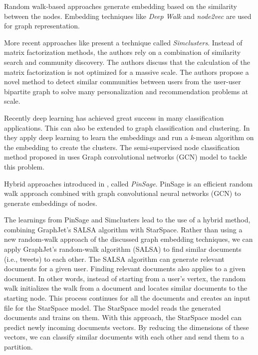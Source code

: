 Random walk-based approaches generate embedding based on the similarity between the nodes. Embedding techniques like \emph{Deep Walk} \cite{perozziDeepWalkOnlineLearning2014} and \emph{node2vec} \cite{groverNode2vecScalableFeature2016} are used for graph representation.


More recent approaches like \cite{satuluriSimClustersCommunityBasedRepresentations2020} present a technique called \emph{Simclusters}. Instead of matrix factorization methods, the authors rely on a combination of similarity search and community discovery. The authors discuss that the calculation of the matrix factorization is not optimized for a massive scale. The authors propose a novel method to detect similar communities between users from the user-user bipartite graph to solve many personalization and recommendation problems at scale.


Recently deep learning has achieved great success in many classification applications. This can also be extended to graph classification and clustering. In \cite{tianLearningDeepRepresentations2014} they apply deep learning to learn the embeddings and run a \emph{k}-mean algorithm on the embedding to create the clusters. The semi-supervised node classification method proposed in \cite{kipfSemiSupervisedClassificationGraph2017} uses Graph convolutional networks (GCN) model to tackle this problem. 

Hybrid approaches introduced in \cite{yingGraphConvolutionalNeural2018}, called \emph{PinSage}. PinSage is an efficient random walk approach combined with graph convolutional neural networks (GCN) to generate embeddings of nodes.


The learnings from PinSage and Simclusters lead to the use of a hybrid method, combining GraphJet's SALSA algorithm with StarSpace. Rather than using a new random-walk approach of the discussed graph embedding techniques, we can apply GraphJet's random-walk algorithm (SALSA) to find similar documents (i.e., tweets) to each other. The SALSA algorithm can generate relevant documents for a given user. Finding relevant documents also applies to a given document. In other words, instead of starting from a user's vertex, the random walk initializes the walk from a document and locates similar documents to the starting node. This process continues for all the documents and creates an input file for the StarSpace model. The StarSpace model reads the generated documents and trains on them. With this approach, the StarSpace model can predict newly incoming documents vectors. By reducing the dimensions of these vectors, we can classify similar documents with each other and send them to a partition. 
